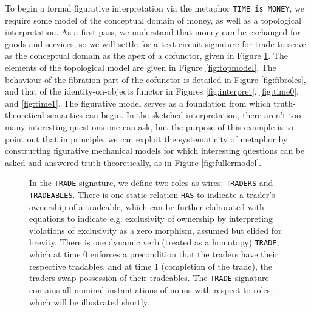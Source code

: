 \begin{example}
To begin a formal figurative interpretation via the metaphor \texttt{TIME is MONEY}, we require some model of the conceptual domain of money, as well as a topological interpretation. As a first pass, we understand that money can be exchanged for goods and services, so we will settle for a text-circuit signature for trade to serve as the conceptual domain as the apex of a cofunctor, given in Figure \ref{fig:tradesig}. The elements of the topological model are given in Figure \ref{fig:topmodel}. The behaviour of the fibration part of the cofunctor is detailed in Figure \ref{fig:fibroles}, and that of the identity-on-objects functor in Figures \ref{fig:interpret}, \ref{fig:time0}, and \ref{fig:time1}. The figurative model serves as a foundation from which truth-theoretical semantics can begin. In the sketched interpretation, there aren't too many interesting questions one can ask, but the purpose of this example is to point out that in principle, we can exploit the systematicity of metaphor by constructing figurative mechanical models for which interesting questions can be asked and answered truth-theoretically, as in Figure \ref{fig:fullermodel}.
\begin{figure}[h]\label{fig:tradesig}
\centering
{}
\caption{In the \texttt{TRADE} signature, we define two roles as wires: \texttt{TRADERS} and \texttt{TRADEABLES}. There is one static relation \texttt{HAS} to indicate a trader's ownership of a tradeable, which can be further elaborated with equations to indicate e.g. exclusivity of ownership by interpreting violations of exclusivity as a zero morphism, assumed but elided for brevity. There is one dynamic verb (treated as a homotopy) \texttt{TRADE}, which at time 0 enforces a precondition that the traders have their respective tradables, and at time 1 (completion of the trade), the traders swap possession of their tradeables. The \texttt{TRADE} signature contains all nominal instantiations of nouns with respect to roles, which will be illustrated shortly.}

\end{figure}
\end{example}
